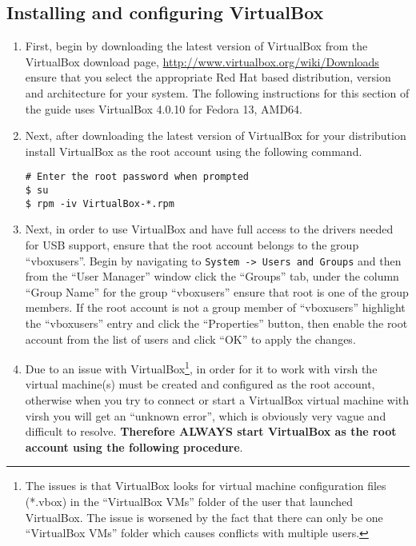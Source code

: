 \newpage
\subsection{Installing and configuring VirtualBox}
\label{sec:rhvbox}
\begin{enumerate}
\item	First, begin by downloading the latest version of VirtualBox from the VirtualBox download page,
		\url{http://www.virtualbox.org/wiki/Downloads} ensure that you select the appropriate Red Hat based
		distribution, version and architecture for your system. The following instructions for this section of
		the guide uses VirtualBox 4.0.10 for Fedora 13, AMD64.
		
\item	Next, after downloading the latest version of VirtualBox for your distribution install VirtualBox as the root
		account using the following command.
\begin{lstlisting}
# Enter the root password when prompted
$ su
$ rpm -iv VirtualBox-*.rpm
\end{lstlisting}	

\item	Next, in order to use VirtualBox and have full access to the drivers needed for USB support, ensure that the root
		account belongs to the group ``vboxusers''. Begin by navigating to \verb|System -> Users and Groups| and then from
		the ``User Manager'' window click the ``Groups'' tab, under the column ``Group Name'' for the group ``vboxusers'' 
		ensure that root is one of the group members. If the root account is not a group member of ``vboxusers'' highlight
		the ``vboxusers'' entry and click the ``Properties'' button, then enable the root account from the list of users
		and click ``OK'' to apply the changes.
		
\item	Due to an issue with VirtualBox\footnote{The issues is that VirtualBox looks for virtual machine configuration files (*.vbox)
		in the ``VirtualBox VMs'' folder of the user that launched VirtualBox. The issue is worsened by the fact that there can
		only be one ``VirtualBox VMs'' folder which causes conflicts with multiple users.}, in order for it to work with virsh 
		the virtual machine(s) must be created and configured as the root account, otherwise when you try to connect or start a 
		VirtualBox virtual machine with virsh you will get an ``unknown error'', which is obviously very vague and difficult to 
		resolve. {\bf Therefore ALWAYS start VirtualBox as the root account using the following procedure}.


\end{enumerate}
